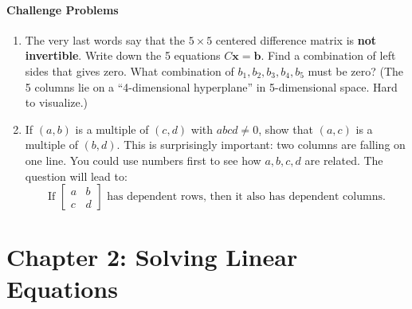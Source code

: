\documentclass[14pt, a4paper]{article}
\begin{document}
\paragraph{Challenge Problems}
\begin{enumerate}[resume]
    \item The very last words say that the $5 \times 5$ centered difference matrix is \textbf{not invertible}. Write down the 5 equations $C\boldsymbol{x} = \boldsymbol{b}$. Find a combination of left sides that gives zero. What combination of $b_1, b_2, b_3, b_4, b_5$ must be zero? (The 5 columns lie on a ``4-dimensional hyperplane'' in 5-dimensional space. Hard to visualize.)

    \item If $(a,b)$ is a multiple of $(c,d)$ with $abcd \ne 0$, show that $(a,c)$ is a multiple of $(b,d)$. This is surprisingly important: two columns are falling on one line. You could use numbers first to see how $a, b, c, d$ are related. The question will lead to:
          \[
              \text{If }
              \begin{bmatrix}
                  a & b \\
                  c & d
              \end{bmatrix}
              \text{ has dependent rows, then it also has dependent columns.}
          \]
\end{enumerate}
\newpage

\section{Chapter 2: Solving Linear Equations }
\end{document}
